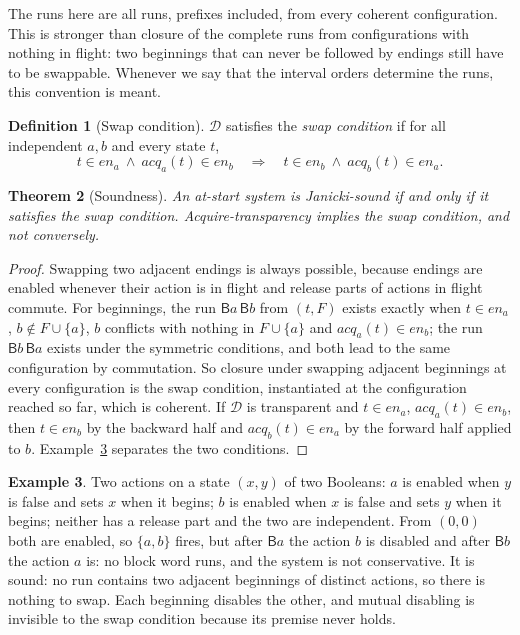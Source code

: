 \documentclass[preprint,12pt]{elsarticle}
\theoremstyle{plain}
\newtheorem{theorem}{Theorem}[section]
\theoremstyle{definition}
\newtheorem{definition}[theorem]{Definition}
\newtheorem{example}[theorem]{Example}
\newcommand{\en}{\mathit{en}}
\newcommand{\acq}{\mathit{acq}}
\newcommand{\B}[1]{\mathsf{B}#1}
\newcommand{\D}{\mathcal{D}}
\begin{document}
The runs here are all runs, prefixes included, from every coherent configuration. This is stronger than closure of the complete runs from configurations with nothing in flight: two beginnings that can never be followed by endings still have to be swappable. Whenever we say that the interval orders determine the runs, this convention is meant.

\begin{definition}[Swap condition]
\label{def:swap}
$\D$ satisfies the \emph{swap condition} if for all independent $a, b$ and every state $t$,
\[
t \in \en_a \ \wedge\ \acq_a(t) \in \en_b \quad\Longrightarrow\quad t \in \en_b \ \wedge\ \acq_b(t) \in \en_a .
\]
\end{definition}

\begin{theorem}[Soundness]
\label{thm:A-sound}
An at-start system is Janicki-sound if and only if it satisfies the swap condition. Acquire-transparency implies the swap condition, and not conversely.
\end{theorem}

\begin{proof}
Swapping two adjacent endings is always possible, because endings are enabled whenever their action is in flight and release parts of actions in flight commute. For beginnings, the run $\B{a}\,\B{b}$ from $(t, F)$ exists exactly when $t \in \en_a$, $b \notin F \cup \{a\}$, $b$ conflicts with nothing in $F \cup \{a\}$ and $\acq_a(t) \in \en_b$; the run $\B{b}\,\B{a}$ exists under the symmetric conditions, and both lead to the same configuration by commutation. So closure under swapping adjacent beginnings at every configuration is the swap condition, instantiated at the configuration reached so far, which is coherent. If $\D$ is transparent and $t \in \en_a$, $\acq_a(t) \in \en_b$, then $t \in \en_b$ by the backward half and $\acq_b(t) \in \en_a$ by the forward half applied to $b$. Example~\ref{ex:sound-not-transparent} separates the two conditions.
\end{proof}

\begin{example}
\label{ex:sound-not-transparent}
Two actions on a state $(x, y)$ of two Booleans: $a$ is enabled when $y$ is false and sets $x$ when it begins; $b$ is enabled when $x$ is false and sets $y$ when it begins; neither has a release part and the two are independent. From $(0, 0)$ both are enabled, so $\{a, b\}$ fires, but after $\B{a}$ the action $b$ is disabled and after $\B{b}$ the action $a$ is: no block word runs, and the system is not conservative. It is sound: no run contains two adjacent beginnings of distinct actions, so there is nothing to swap. Each beginning disables the other, and mutual disabling is invisible to the swap condition because its premise never holds.
\end{example}
\end{document}
